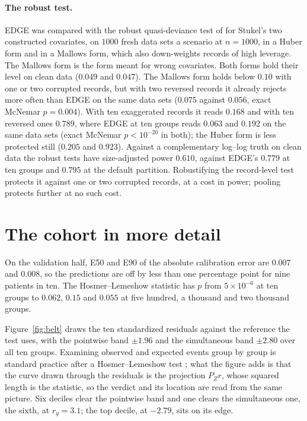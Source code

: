 \documentclass[11pt]{article}
\begin{document}
\paragraph{The robust test.} EDGE was compared with the robust quasi-deviance test of
\citet{cantoni2001robust} for Stukel's two constructed covariates, on $1000$ fresh data sets a scenario
at $n=1000$, in a Huber form and in a Mallows form, which also down-weights records of high leverage.
The Mallows form is the form meant for wrong covariates. Both forms hold their level on clean data
($0.049$ and $0.047$). The Mallows form holds below $0.10$ with one or two corrupted records, but with
two reversed records it already rejects more often than EDGE on the same data sets ($0.075$ against
$0.056$, exact McNemar $p=0.004$). With ten exaggerated records it reads $0.168$ and with ten reversed
ones $0.789$, where EDGE at ten groups reads $0.063$ and $0.192$ on the same data sets (exact McNemar
$p<10^{-20}$ in both); the Huber form is less protected still ($0.205$ and $0.923$). Against a
complementary log--log truth on clean data the robust tests have size-adjusted power $0.610$, against
EDGE's $0.779$ at ten groups and $0.795$ at the default partition. Robustifying the record-level test
protects it against one or two corrupted records, at a cost in power; pooling protects further at no
such cost.

\section{The cohort in more detail}\label{si:cohort}

On the validation half, E50 and E90 of the absolute calibration error are $0.007$ and $0.008$, so the
predictions are off by less than one percentage point for nine patients in ten. The Hosmer--Lemeshow
statistic has $p$ from $5\times10^{-6}$ at ten groups to $0.062$, $0.15$ and $0.055$ at five hundred, a
thousand and two thousand groups.

Figure~\ref{fig:belt} draws the ten standardized residuals against the reference the test uses, with
the pointwise band $\pm1.96$ and the simultaneous band $\pm2.80$ over all ten groups. Examining observed
and expected events group by group is standard practice after a Hosmer--Lemeshow test
\citep{hosmer2013applied}; what the figure adds is that the curve drawn through the residuals is the
projection $P_Z r$, whose squared length is the statistic, so the verdict and its location are read
from the same picture. Six deciles clear the pointwise band and one clears the simultaneous one, the
sixth, at $r_g=3.1$; the top decile, at $-2.79$, sits on its edge.
\end{document}
